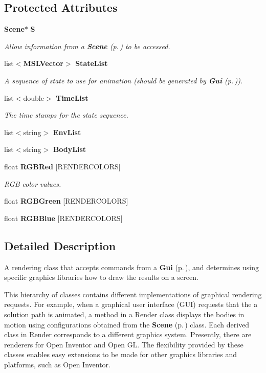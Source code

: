 \subsection*{Protected Attributes}
\begin{CompactItemize}
\item 
{\bf Scene}$\ast$ {\bf S}
\begin{CompactList}\small\item\em Allow information from a {\bf Scene} {\rm (p.\,\pageref{class_Scene})} to be accessed.\item\end{CompactList}\item 
list$<${\bf MSLVector}$>$ {\bf State\-List}
\begin{CompactList}\small\item\em A sequence of state to use for animation (should be generated by {\bf Gui} {\rm (p.\,\pageref{class_Gui})}).\item\end{CompactList}\item 
list$<$double$>$ {\bf Time\-List}
\begin{CompactList}\small\item\em The time stamps for the state sequence.\item\end{CompactList}\item 
list$<$string$>$ {\bf Env\-List}
\item 
list$<$string$>$ {\bf Body\-List}
\item 
float {\bf RGBRed} [RENDERCOLORS]
\begin{CompactList}\small\item\em RGB color values.\item\end{CompactList}\item 
float {\bf RGBGreen} [RENDERCOLORS]
\item 
float {\bf RGBBlue} [RENDERCOLORS]
\end{CompactItemize}


\subsection{Detailed Description}
A rendering class that accepts commands from a {\bf Gui} {\rm (p.\,\pageref{class_Gui})}, and determines using specific graphics libraries how to draw the results on a screen.

This hierarchy of classes contains different implementations of graphical rendering requests. For example, when a graphical user interface (GUI) requests that the a solution path is animated, a method in a Render class displays the bodies in motion using configurations obtained from the {\bf Scene} {\rm (p.\,\pageref{class_Scene})} class. Each derived class in Render corresponds to a different graphics system. Presently, there are renderers for Open Inventor and Open GL. The flexibility provided by these classes enables easy extensions to be made for other graphics libraries and platforms, such as Open Inventor.

